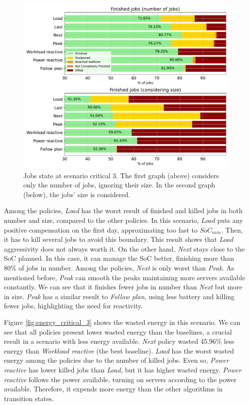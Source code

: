 \begin{figure}[!htb]
    \centering
    \includegraphics[scale=0.55]{Images/Compensations/jobs_critical_3.pdf}
    \caption[Jobs state at scenario critical 3.]{Jobs state at scenario critical 3. The first graph (above) considers only the number of jobs, ignoring their size. In the second graph (below), the jobs' size is considered.}
    \label{fig:jobs_critical_3}
\end{figure}

Among the policies, \emph{Load} has the worst result of finished and killed jobs in both number and size, compared to the other policies. In this scenario, \emph{Load} puts any positive compensation on the first day, approximating too fast to $SoC_{min}$. Then, it has to kill several jobs to avoid this boundary. This result shows that \emph{Load} aggressivity does not always worth it. On the other hand, \emph{Next} stays close to the SoC planned. In this case, it can manage the SoC better, finishing more than 80\% of jobs in number. Among the policies, \emph{Next} is only worst than \emph{Peak}. As mentioned before, \emph{Peak} can smooth the peaks maintaining more servers available constantly. We can see that it finishes fewer jobs in number than \emph{Next} but more in size. \emph{Peak} has a similar result to \emph{Follow plan}, using less battery and killing fewer jobs, highlighting the need for reactivity.

Figure \ref{fig:energy_critical_3} shows the wasted energy in this scenario. We can see that all policies present lower wasted energy than the baselines, a crucial result in a scenario with less energy available. \emph{Next} policy wasted 45.96\% less energy than \emph{Workload reactive} (the best baseline). \emph{Load} has the worst wasted energy among the policies due to the number of killed jobs. Even so, \emph{Power reactive} has lower killed jobs than \emph{Load}, but it has higher wasted energy. \emph{Power reactive} follows the power available, turning on servers according to the power available. Therefore, it expends more energy than the other algorithms in transition states.


